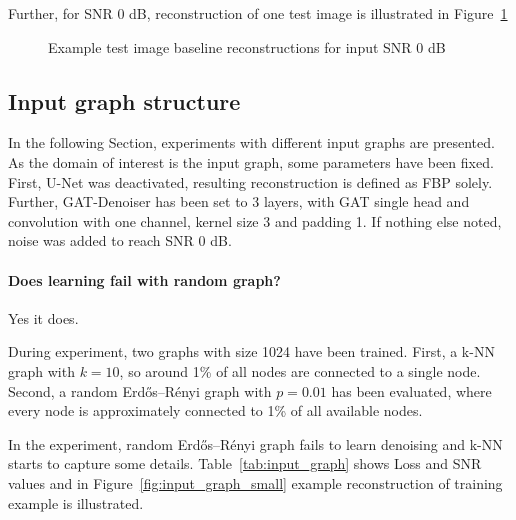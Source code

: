   Further, for SNR 0 dB, reconstruction of one test image is illustrated in Figure~\ref{fig:baseline_small}

  \begin{figure}[H]
    \label{fig:baseline_small}
    \hfill
    \hfill
    \hfill
    \hfill
    \hfill
    \hfill
	\caption{Example test image baseline reconstructions for input SNR 0 dB}
\end{figure}





  \subsection{Input graph structure}
  In the following Section, experiments with different input graphs are presented.
  As the domain of interest is the input graph, some parameters have been fixed.
  First, U-Net was deactivated, resulting reconstruction is defined as FBP solely.
  Further, GAT-Denoiser has been set to 3 layers, with GAT single head and convolution 
  with one channel, kernel size 3 and padding 1. 
  If nothing else noted, noise was added to reach SNR 0 dB.

  \paragraph{Does learning fail with random graph?}
  Yes it does.

  During experiment, two graphs with size 1024 have been trained.
  First, a k-NN graph with $k=10$, so around 1\%  of all nodes are connected to a single node.
  Second, a random Erdős–Rényi graph with $p=0.01$ has been evaluated, where every node is 
  approximately connected to 1\% of all available nodes.
  
  In the experiment, random Erdős–Rényi graph fails to learn denoising and k-NN starts to capture some details.
  Table~\ref{tab:input_graph} shows Loss and SNR values and in Figure~\ref{fig:input_graph_small} example reconstruction 
  of training example is illustrated.

